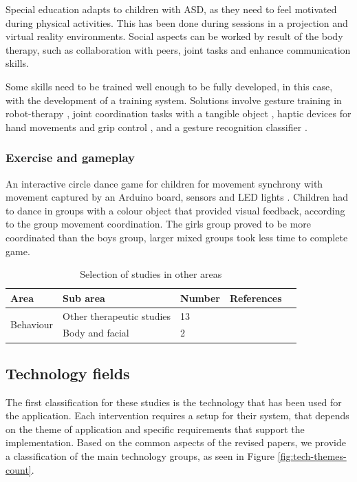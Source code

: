\documentclass[a4paper,fleqn]{cas-sc}
\begin{document}
Special education adapts to children with ASD, as they need to feel motivated during physical activities. This has been done during sessions in a projection \cite{Cornejo17} and virtual \cite{Hocking22} reality environments.
Social aspects can be worked by result of the body therapy, such as collaboration with peers, joint tasks and enhance communication skills.


Some skills need to be trained well enough to be fully developed, in this case, with the development of a training system. Solutions involve gesture training in robot-therapy \cite{Fassina22}, joint coordination tasks with a tangible object \cite{Giraud21}, haptic devices for hand movements and grip control \cite{Zhao21}, and a gesture recognition classifier \cite{Oprea17}.


\subsubsection{Exercise and gameplay}
\label{sec:app-contexts-exercise}
An interactive circle dance game for children for movement synchrony with movement captured by an Arduino board, sensors and LED lights \cite{Baharin19}. Children had to dance in groups with a colour object that provided visual feedback, according to the group movement coordination. The girls group proved to be more coordinated than the boys group, larger mixed groups took less time to complete game.

\begin{table}[h]
\centering
\begin{center}
\begin{tabular*}{6.2in}{p{0.85in}|p{0.82in}|p{0.35in}|p{3.5in}p{0in}}
\hline
Area   & Sub area   & Number & References  &  \\ \hline
\multirow{2}{*}{Behaviour}   
    & Other therapeutic studies  & 13 & \cite{Ascensao22,Li22,Li21,Santos21,
    Sayis21,Zampella21,Rosly20,Wilson20,Javed19,Geminiani19,Sorce18, Chevalier17,Whyatt17} &  \\ \cline{1-4}
\multirow{1}{*}{\centering Expression} 
    & Body and facial     & 2     & \cite{Pohl20, Giomi18}  & 
    \\ \cline{1-4}
\end{tabular*}
\caption{Selection of studies in other areas}
\label{TABLE:area-other}
\end{center}
\end{table}

\subsection{Technology fields}
\label{sec:tech-fields}
The first classification for these studies is the technology that has been used for the application. Each intervention requires a setup for their system, that depends on the theme of application and specific requirements that support the implementation. Based on the common aspects of the revised papers, we provide a classification of the main technology groups, as seen in Figure \ref{fig:tech-themes-count}.
\end{document}

